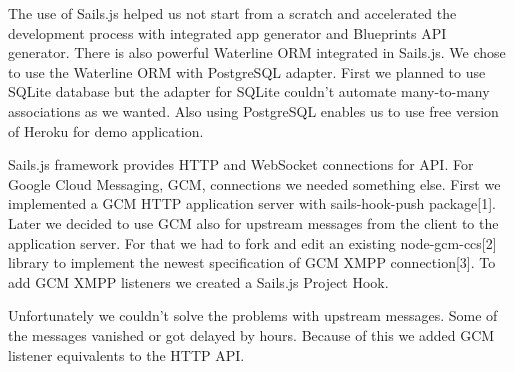 The use of Sails.js helped us not start from a scratch and accelerated the development process with integrated app generator and Blueprints API generator. There is also powerful Waterline ORM integrated in Sails.js. We chose to use the Waterline ORM with PostgreSQL adapter. First we planned to use SQLite database but the adapter for SQLite couldn't automate many-to-many associations as we wanted. Also using PostgreSQL enables us to use free version of Heroku for demo application.

Sails.js framework provides HTTP and WebSocket connections for API. For Google Cloud Messaging, GCM, connections we needed something else. First we implemented a GCM HTTP application server with sails-hook-push package[1]. Later we decided to use GCM also for upstream messages from the client to the application server. For that we had to fork and edit an existing node-gcm-ccs[2] library to implement the newest specification of GCM XMPP connection[3]. To add GCM XMPP listeners we created a Sails.js Project Hook.

Unfortunately we couldn't solve the problems with upstream messages. Some of the messages vanished or got delayed by hours. Because of this we added GCM listener equivalents to the HTTP API.
